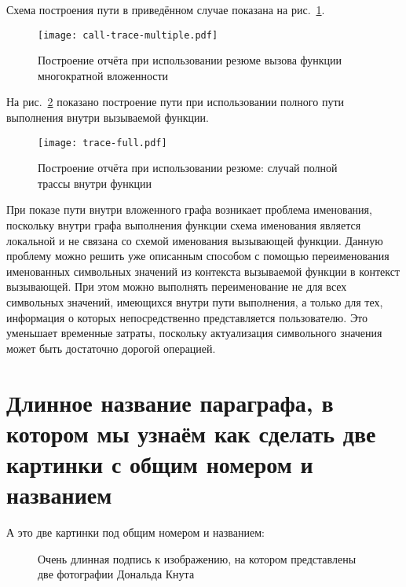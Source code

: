 Схема построения пути в приведённом случае показана на рис.~\ref{pic:call-trace-multiple}.

\begin{figure}
   \centering
   \texttt{[image: call-trace-multiple.pdf]}
   \caption{Построение отчёта при использовании резюме вызова функции многократной вложенности}\label{pic:call-trace-multiple}
\end{figure}


На рис.~\ref{pic:trace-full} показано построение пути при использовании полного пути выполнения внутри вызываемой функции.

\begin{figure}
   \centering
   \texttt{[image: trace-full.pdf]}
   \caption{Построение отчёта при использовании резюме: случай полной трассы внутри функции}\label{pic:trace-full}
\end{figure}


При показе пути внутри вложенного графа возникает проблема именования, поскольку внутри графа выполнения функции схема именования является локальной и не связана со схемой именования вызывающей функции. Данную проблему можно решить уже описанным способом с помощью переименования именованных символьных значений из контекста вызываемой функции в контекст вызывающей. При этом можно выполнять переименование не для всех символьных значений, имеющихся внутри пути выполнения, а только для тех, информация о которых непосредственно представляется пользователю. Это уменьшает временные затраты, поскольку актуализация символьного значения может быть достаточно дорогой операцией.


\section{Длинное название параграфа, в котором мы узнаём как сделать две картинки с общим номером и названием} \label{sect2_2}

А это две картинки под общим номером и названием:
\begin{figure}[ht]
  \begin{minipage}[ht]{0.49\linewidth}
  \end{minipage}
  \hfill
  \begin{minipage}[ht]{0.49\linewidth}
  \end{minipage}
  \caption{Очень длинная подпись к изображению, на котором представлены две фотографии Дональда Кнута}
  \label{img:knuth}  
\end{figure}

